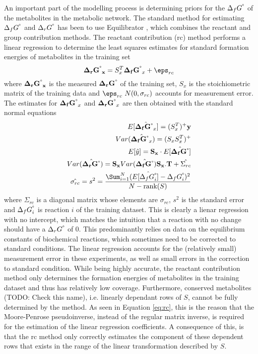 \documentclass[10pt,letterpaper]{article}
\newcommand{\sdgf}{\Delta_fG^{\degree}}
\newcommand{\sdgr}{\Delta_rG^{\degree}}
\newcommand{\bsdgf}{\mathbf{\sdgf}}
\newcommand{\bsdgr}{\mathbf{\sdgr}}
\begin{document}
An important part of the modelling process is determining priors for the $\sdgf$ of the metabolites in the metabolic network.
The standard method for estimating $\sdgf$ and $\sdgr$ has been to use Equilibrator \cite{noor_2013_equilibrator}, which combines the reactant and group contribution methods.
The reactant contribution (rc) method performs a linear regression to determine the least squares estimates for standard formation energies of metabolites in the training set
\[
    \label{eq:rc}
    \mathbf{\bsdgr_x} = S_x^T\bsdgf_x + \eps_{rc}
\]
where $\mathbf{\bsdgr_x}$ is the measured $\bsdgr$ of the training set, $S_x$ is the stoichiometric matrix of the training data and $\eps_{rc} ~ N(0, \sigma_{rc})$ accounts for measurement error. %
The estimates for $\bsdgf_x$ and $\bsdgr_x$ are then obtained with the standard normal equations
\begin{align}
    E[\hat{\bsdgf_x}] = (S_x^T)^+ \mathbf{y}\\
    Var(\hat{\bsdgf_x}) = (S_x S_x^T)^+ \\
    E[\hat{y}] = \mathbf{S_x} \cdot E[\hat{\bsdgf}] \\
    Var(\hat{\bsdgr}) = \mathbf{S_x} Var(\hat{\bsdgf}) \mathbf{S_x.T} + \hat{\Sigma_{rc}} \\
    \hat{\sigma_{rc}} = s^2 = \frac{\Sum_{i=1}^{N} (E[\hat{\sdgf_i}] - \sdgf_i)^2}{N-\text{rank}(S)}
\end{align}
where $\Sigma_{rc}$ is a diagonal matrix whose elements are $\sigma_{rc}$, $s^2$ is the standard error and $\sdgf_i$ is reaction $i$ of the training dataset.
This is clearly a lienar regression with no intercept, which matches the intuition that a reaction with no change should have a $\sdgr$ of 0.
This predominantly relies on data on the equilibrium constants of biochemical reactions, which sometimes need to be corrected to standard conditions. %
The linear regression accounts for the (relatively small) measurement error in these experiments, as well as small errors in the correction to standard condition. %
While being highly accurate, the reactant contribution method only determines the formation energies of metabolites in the training dataset and thus has relatively low coverage.
Furthermore, conserved metabolites (TODO: Check this name), i.e. linearly dependant rows of $S$, cannot be fully determined by the method.
As seen in Equation \ref{eq:rc}, this is the reason that the Moore-Penrose pseudoinverse, instead of the regular matrix inverse, is required for the estimation of the linear regression coefficients.
A consequence of this, is that the rc method only correctly estimates the component of these dependent rows that exists in the range of the linear transformation described by $S$.
\end{document}
